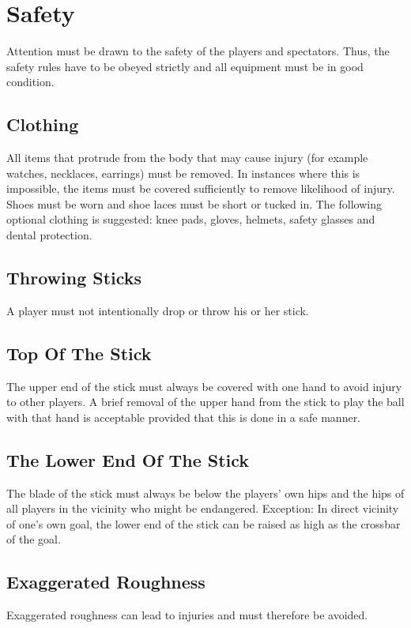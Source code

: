 \section{Safety}

Attention must be drawn to the safety of the players and spectators.
Thus, the safety rules have to be obeyed strictly and all equipment must be in good condition.

\subsection{Clothing \label{subsec:hockey_safety_clothing}}
All items that protrude from the body that may cause injury (for example watches, necklaces, earrings) must be removed.
In instances where this is impossible, the items must be covered sufficiently to remove likelihood of injury.
Shoes must be worn and shoe laces must be short or tucked in.
The following optional clothing is suggested: knee pads, gloves, helmets, safety glasses and dental protection.

\subsection{Throwing Sticks}
A player must not intentionally drop or throw his or her stick.

\subsection{Top Of The Stick}
The upper end of the stick must always be covered with one hand to avoid injury to other players.
A brief removal of the upper hand from the stick to play the ball with that hand is acceptable provided that this is done in a safe manner.

\subsection{The Lower End Of The Stick \label{subsec:hockey_safety_stick}}
The blade of the stick must always be below the players' own hips and the hips of all players in the vicinity who might be endangered.
Exception: In direct vicinity of one's own goal, the lower end of the stick can be raised as high as the crossbar of the goal.

\subsection{Exaggerated Roughness}
Exaggerated roughness can lead to injuries and must therefore be avoided.


